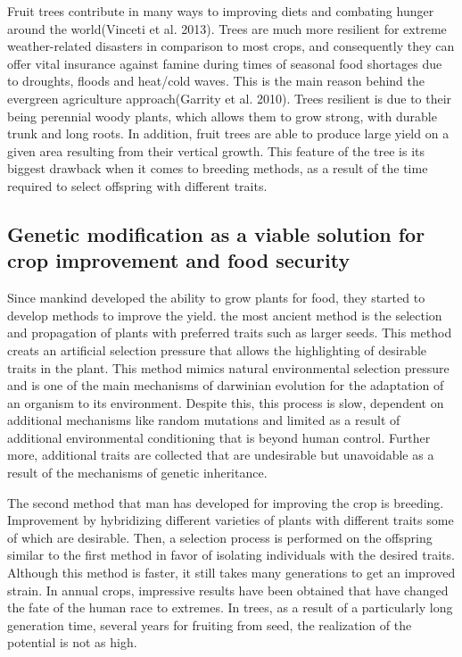 \documentclass[
]{article}
\begin{document}
Fruit trees contribute in many ways to improving diets and combating
hunger around the world(Vinceti et al. 2013). Trees are much more
resilient for extreme weather-related disasters in comparison to most
crops, and consequently they can offer vital insurance against famine
during times of seasonal food shortages due to droughts, floods and
heat/cold waves. This is the main reason behind the evergreen
agriculture approach(Garrity et al. 2010). Trees resilient is due to
their being perennial woody plants, which allows them to grow strong,
with durable trunk and long roots. In addition, fruit trees are able to
produce large yield on a given area resulting from their vertical
growth. This feature of the tree is its biggest drawback when it comes
to breeding methods, as a result of the time required to select
offspring with different traits.

\hypertarget{genetic-modification-as-a-viable-solution-for-crop-improvement-and-food-security}{%
\subsection{Genetic modification as a viable solution for crop
improvement and food
security}\label{genetic-modification-as-a-viable-solution-for-crop-improvement-and-food-security}}

Since mankind developed the ability to grow plants for food, they
started to develop methods to improve the yield. the most ancient method
is the selection and propagation of plants with preferred traits such as
larger seeds. This method creats an artificial selection pressure that
allows the highlighting of desirable traits in the plant. This method
mimics natural environmental selection pressure and is one of the main
mechanisms of darwinian evolution for the adaptation of an organism to
its environment. Despite this, this process is slow, dependent on
additional mechanisms like random mutations and limited as a result of
additional environmental conditioning that is beyond human control.
Further more, additional traits are collected that are undesirable but
unavoidable as a result of the mechanisms of genetic inheritance.

The second method that man has developed for improving the crop is
breeding. Improvement by hybridizing different varieties of plants with
different traits some of which are desirable. Then, a selection process
is performed on the offspring similar to the first method in favor of
isolating individuals with the desired traits. Although this method is
faster, it still takes many generations to get an improved strain. In
annual crops, impressive results have been obtained that have changed
the fate of the human race to extremes. In trees, as a result of a
particularly long generation time, several years for fruiting from seed,
the realization of the potential is not as high.
\end{document}
